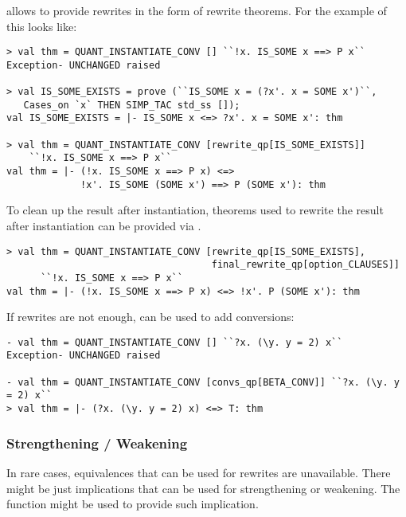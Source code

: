  allows to provide rewrites in the form of rewrite theorems.
For the example of  this looks like:

\begin{session}
\begin{verbatim}
> val thm = QUANT_INSTANTIATE_CONV [] ``!x. IS_SOME x ==> P x``
Exception- UNCHANGED raised

> val IS_SOME_EXISTS = prove (``IS_SOME x = (?x'. x = SOME x')``,
   Cases_on `x` THEN SIMP_TAC std_ss []);
val IS_SOME_EXISTS = |- IS_SOME x <=> ?x'. x = SOME x': thm

> val thm = QUANT_INSTANTIATE_CONV [rewrite_qp[IS_SOME_EXISTS]]
    ``!x. IS_SOME x ==> P x``
val thm = |- (!x. IS_SOME x ==> P x) <=>
             !x'. IS_SOME (SOME x') ==> P (SOME x'): thm
\end{verbatim}
\end{session}

To clean up the result after instantiation, theorems used to rewrite the result after instantiation can be provided via
.
\begin{session}
\begin{verbatim}
> val thm = QUANT_INSTANTIATE_CONV [rewrite_qp[IS_SOME_EXISTS],
                                    final_rewrite_qp[option_CLAUSES]]
      ``!x. IS_SOME x ==> P x``
val thm = |- (!x. IS_SOME x ==> P x) <=> !x'. P (SOME x'): thm
\end{verbatim}
\end{session}

If rewrites are not enough,  can be used to add conversions:
\begin{session}
\begin{verbatim}
- val thm = QUANT_INSTANTIATE_CONV [] ``?x. (\y. y = 2) x``
Exception- UNCHANGED raised

- val thm = QUANT_INSTANTIATE_CONV [convs_qp[BETA_CONV]] ``?x. (\y. y = 2) x``
> val thm = |- (?x. (\y. y = 2) x) <=> T: thm
\end{verbatim}
\end{session}

\subsubsection{Strengthening / Weakening}

In rare cases, equivalences that can be used for rewrites are unavailable. There might be just implications that
can be used for strengthening or weakening. The function
 might be used to provide such implication.

